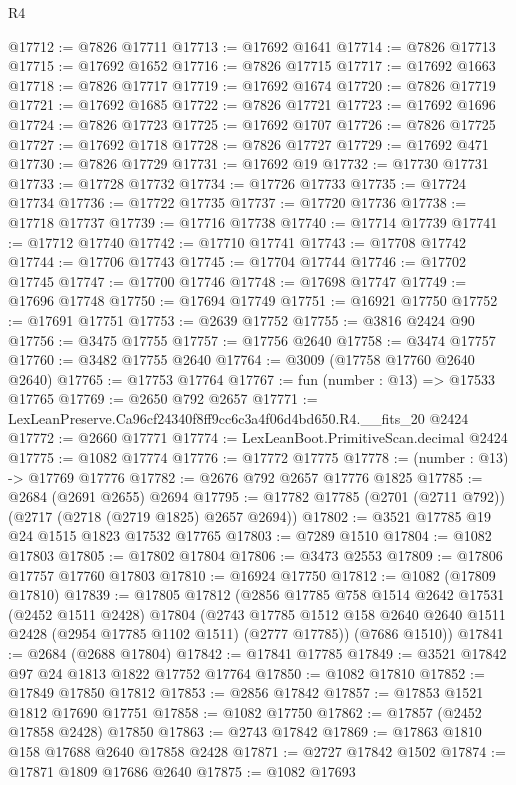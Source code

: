 \begin{lexlean}{R4}
\begin{coremodule}
@17712 := @7826 @17711
@17713 := @17692 @1641
@17714 := @7826 @17713
@17715 := @17692 @1652
@17716 := @7826 @17715
@17717 := @17692 @1663
@17718 := @7826 @17717
@17719 := @17692 @1674
@17720 := @7826 @17719
@17721 := @17692 @1685
@17722 := @7826 @17721
@17723 := @17692 @1696
@17724 := @7826 @17723
@17725 := @17692 @1707
@17726 := @7826 @17725
@17727 := @17692 @1718
@17728 := @7826 @17727
@17729 := @17692 @471
@17730 := @7826 @17729
@17731 := @17692 @19
@17732 := @17730 @17731
@17733 := @17728 @17732
@17734 := @17726 @17733
@17735 := @17724 @17734
@17736 := @17722 @17735
@17737 := @17720 @17736
@17738 := @17718 @17737
@17739 := @17716 @17738
@17740 := @17714 @17739
@17741 := @17712 @17740
@17742 := @17710 @17741
@17743 := @17708 @17742
@17744 := @17706 @17743
@17745 := @17704 @17744
@17746 := @17702 @17745
@17747 := @17700 @17746
@17748 := @17698 @17747
@17749 := @17696 @17748
@17750 := @17694 @17749
@17751 := @16921 @17750
@17752 := @17691 @17751
@17753 := @2639 @17752
@17755 := @3816 @2424 @90
@17756 := @3475 @17755
@17757 := @17756 @2640
@17758 := @3474 @17757
@17760 := @3482 @17755 @2640
@17764 := @3009 (@17758 @17760 @2640 @2640)
@17765 := @17753 @17764
@17767 := fun (number : @13) => @17533 @17765
@17769 := @2650 @792 @2657
@17771 := LexLeanPreserve.Ca96cf24340f8ff9cc6c3a4f06d4bd650.R4.__fits_20 @2424
@17772 := @2660 @17771
@17774 := LexLeanBoot.PrimitiveScan.decimal @2424
@17775 := @1082 @17774
@17776 := @17772 @17775
@17778 := (number : @13) -> @17769 @17776
@17782 := @2676 @792 @2657 @17776 @1825
@17785 := @2684 (@2691 @2655) @2694
@17795 := @17782 @17785 (@2701 (@2711 @792)) (@2717 (@2718 (@2719 @1825) @2657 @2694))
@17802 := @3521 @17785 @19 @24 @1515 @1823 @17532 @17765
@17803 := @7289 @1510
@17804 := @1082 @17803
@17805 := @17802 @17804
@17806 := @3473 @2553
@17809 := @17806 @17757 @17760 @17803
@17810 := @16924 @17750
@17812 := @1082 (@17809 @17810)
@17839 := @17805
    @17812
    (@2856
      @17785
      @758
      @1514
      @2642
      @17531
      (@2452 @1511 @2428)
      @17804
      (@2743 @17785 @1512 @158 @2640 @2640 @1511 @2428 (@2954 @17785 @1102 @1511) (@2777 @17785))
      (@7686 @1510))
@17841 := @2684 (@2688 @17804)
@17842 := @17841 @17785
@17849 := @3521 @17842 @97 @24 @1813 @1822 @17752 @17764
@17850 := @1082 @17810
@17852 := @17849 @17850 @17812
@17853 := @2856 @17842
@17857 := @17853 @1521 @1812 @17690 @17751
@17858 := @1082 @17750
@17862 := @17857 (@2452 @17858 @2428) @17850
@17863 := @2743 @17842
@17869 := @17863 @1810 @158 @17688 @2640 @17858 @2428
@17871 := @2727 @17842 @1502
@17874 := @17871 @1809 @17686 @2640
@17875 := @1082 @17693

\end{coremodule}
\end{lexlean}

